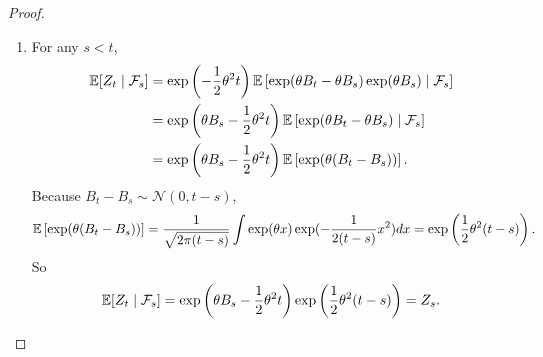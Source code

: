 \begin{exam}
\begin{proof}
\begin{enumerate}[label=(\arabic{*})]
            \item For any $s < t$,
            \begin{align*}
                \mathbb{E}[Z_t \mid \mathcal{F}_s] &= \exp\left(-\frac{1}{2}\theta^2 t\right)\mathbb{E}\left[\exp (\theta B_t - \theta B_s) \exp(\theta B_s) \mid \mathcal{F}_s\right] \\
                &= \exp\left(\theta B_s-\frac{1}{2}\theta^2 t\right)\mathbb{E}\left[\exp (\theta B_t - \theta B_s) \mid \mathcal{F}_s\right] \\
                &= \exp\left(\theta B_s-\frac{1}{2}\theta^2 t\right)\mathbb{E}\left[\exp (\theta (B_t - B_s))\right].
            \end{align*}
            Because $B_t - B_s \sim \mathcal{N}(0,t-s)$,
            \begin{equation*}
                \mathbb{E}\left[\exp (\theta (B_t - B_s))\right] = \frac{1}{\sqrt{2\pi(t-s)}}\int \exp(\theta x)\exp(-\frac{1}{2(t-s)}x^2) dx = \exp\left(\frac{1}{2}\theta^2(t-s)\right).
            \end{equation*}
            So
            \begin{equation*}
                \mathbb{E}[Z_t \mid \mathcal{F}_s] = \exp\left(\theta B_s-\frac{1}{2}\theta^2 t\right)\exp\left(\frac{1}{2}\theta^2(t-s)\right) = Z_s. \qedhere
            \end{equation*}
        \end{enumerate}
    \end{proof}
\end{exam}


